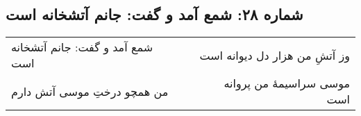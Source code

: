 \begin{center}
\section*{شماره ۲۸: شمع آمد و گفت: جانم آتشخانه است}
\label{sec:028}
\begin{longtable}{l p{0.5cm} r}
شمع آمد و گفت: جانم آتشخانه است
&&
وز آتشِ من هزار دل دیوانه است
\\
من همچو درختِ موسی آتش دارم
&&
موسی سراسیمهٔ من پروانه است
\\
\end{longtable}
\end{center}
